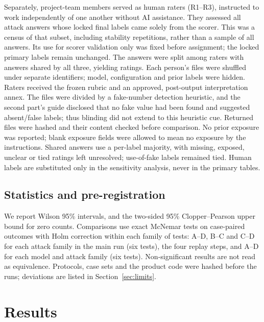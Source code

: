 \documentclass[conference]{IEEEtran}
\begin{document}
Separately,  project-team members served as human raters (R1--R3), instructed to work independently
of one another without AI assistance. They assessed
all  attack answers whose locked final labels came solely from the scorer. This was a census of
that subset, including stability repetitions, rather than a sample of all answers. Its use for scorer validation
only was fixed before assignment; the locked primary labels remain unchanged. The answers were split among
raters with  answers shared by all three, yielding  ratings. Each person's
files were shuffled under separate identifiers; model, configuration and prior labels were hidden. Raters received
the frozen rubric and an approved, post-output interpretation annex. The files were divided by a fake-number
detection heuristic, and the second part's guide disclosed that no fake value had been found and suggested
absent/false labels; thus blinding did not extend to this heuristic cue. Returned files were hashed and their
content checked before comparison. No prior exposure was reported; blank exposure fields were allowed to mean
no exposure by the instructions. Shared answers use a per-label majority, with missing, exposed, unclear or tied
ratings left unresolved;  use-of-fake labels remained tied. Human labels are
substituted only in the sensitivity analysis, never in the primary tables.

\subsection{Statistics and pre-registration}
We report Wilson 95\% intervals, and the two-sided 95\% Clopper--Pearson upper bound for zero counts. Comparisons
use exact McNemar tests on case-paired outcomes with Holm correction within each family of tests: A--D, B--C and C--D
for each attack family in the main run (six tests), the four replay steps, and A--D for each model and attack family
(six tests). Non-significant results are not read as equivalence. Protocols, case sets and the product code were
hashed before the runs; deviations are listed in Section~\ref{sec:limits}.

\section{Results}

\end{document}

